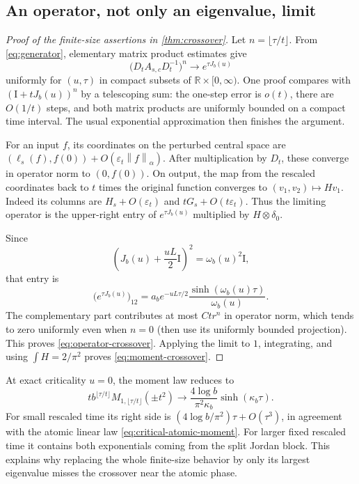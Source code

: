 \documentclass[11pt,a4paper]{article}
\numberwithin{equation}{section}
\theoremstyle{definition}
\theoremstyle{remark}
\newcommand{\RR}{\mathbb R}
\newcommand{\Id}{\mathrm I}
\newcommand{\norm}[1]{\left\lVert#1\right\rVert}
\begin{document}
\subsection{An operator, not only an eigenvalue, limit}
\begin{proof}[Proof of the finite-size assertions in \cref{thm:crossover}]
Let $n=\lfloor\tau/t\rfloor$. From \cref{eq:generator}, elementary
matrix product estimates give
\begin{equation}
 \bigl(D_tA_{s,c}D_t^{-1}\bigr)^n
 \longrightarrow e^{\tau J_b(u)}
 \label{eq:matrix-semigroup}
\end{equation}
uniformly for $(u,\tau)$ in compact subsets of
$\RR\times[0,\infty)$. One proof compares with
$(\Id+tJ_b(u))^n$ by a telescoping sum: the one-step error is $o(t)$,
there are $O(1/t)$ steps, and both matrix products are uniformly bounded
on a compact time interval. The usual exponential approximation then
finishes the argument.

For an input $f$, its coordinates on the perturbed central space are
$(\ell_s(f),f(0))+O(\varepsilon_t\norm f_\alpha)$.
After multiplication by $D_t$, these converge in operator norm to
$(0,f(0))$. On output, the map from the rescaled coordinates back to
$t$ times the original function converges to
$(v_1,v_2)\mapsto H v_1$. Indeed its columns are
$H_s+O(\varepsilon_t)$ and $tG_s+O(t\varepsilon_t)$.
Thus the limiting operator is the upper-right entry of
$e^{\tau J_b(u)}$ multiplied by $H\otimes\delta_0$.

Since
\[
 \left(J_b(u)+\frac{uL}{2}\Id\right)^2=\omega_b(u)^2\Id,
\]
that entry is
\[
 \bigl(e^{\tau J_b(u)}\bigr)_{12}
 =a_b e^{-uL\tau/2}\frac{\sinh(\omega_b(u)\tau)}{\omega_b(u)}.
\]
The complementary part contributes at most $Ct r^n$ in operator norm,
which tends to zero uniformly even when $n=0$ (then use its uniformly
bounded projection). This proves \cref{eq:operator-crossover}.
Applying the limit to $1$, integrating, and using
$\int H=2/\pi^2$ proves \cref{eq:moment-crossover}.
\end{proof}

At exact criticality $u=0$, the moment law reduces to
\begin{equation}
 t b^{\lfloor\tau/t\rfloor}
 M_{1,\lfloor\tau/t\rfloor}(\pm t^2)
 \longrightarrow
 \frac{4\log b}{\pi^2\kappa_b}\sinh(\kappa_b\tau).
 \label{eq:critical-sinh}
\end{equation}
For small rescaled time its right side is
$(4\log b/\pi^2)\tau+O(\tau^3)$, in agreement with the atomic linear
law \cref{eq:critical-atomic-moment}. For larger fixed rescaled time it
contains both exponentials coming from the split Jordan block. This
explains why replacing the whole finite-size behavior by only its
largest eigenvalue misses the crossover near the atomic phase.
\end{document}
